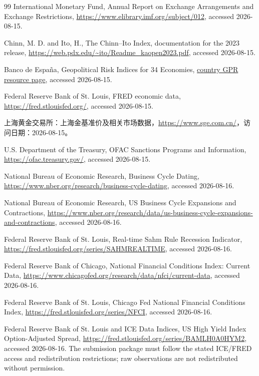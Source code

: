 \documentclass[UTF8,fontset=windows,12pt,openany]{ctexbook}
\begin{document}
\begin{thebibliography}{99}
International Monetary Fund, Annual Report on Exchange Arrangements and Exchange Restrictions, \url{https://www.elibrary.imf.org/subject/012}, accessed 2026-08-15.

Chinn, M. D. and Ito, H., The Chinn--Ito Index, documentation for the 2023 release, \url{https://web.pdx.edu/~ito/Readme_kaopen2023.pdf}, accessed 2026-08-15.

Banco de España, Geopolitical Risk Indices for 34 Economies, \href{https://www.bde.es/wbe/en/areas-actuacion/analisis-e-investigacion/recursos/indices-de-riesgo-geopolitico-generales-y-bilaterales-para-34-economias-6075d2451c9da91.html}{country GPR resource page}, accessed 2026-08-15.

Federal Reserve Bank of St. Louis, FRED economic data, \url{https://fred.stlouisfed.org/}, accessed 2026-08-15.

上海黄金交易所：上海金基准价及相关市场数据，\url{https://www.sge.com.cn/}，访问日期：2026-08-15。

U.S. Department of the Treasury, OFAC Sanctions Programs and Information, \url{https://ofac.treasury.gov/}, accessed 2026-08-15.

National Bureau of Economic Research, Business Cycle Dating, \url{https://www.nber.org/research/business-cycle-dating}, accessed 2026-08-16.

National Bureau of Economic Research, US Business Cycle Expansions and Contractions, \url{https://www.nber.org/research/data/us-business-cycle-expansions-and-contractions}, accessed 2026-08-16.

Federal Reserve Bank of St. Louis, Real-time Sahm Rule Recession Indicator, \url{https://fred.stlouisfed.org/series/SAHMREALTIME}, accessed 2026-08-16.

Federal Reserve Bank of Chicago, National Financial Conditions Index: Current Data, \url{https://www.chicagofed.org/research/data/nfci/current-data}, accessed 2026-08-16.

Federal Reserve Bank of St. Louis, Chicago Fed National Financial Conditions Index, \url{https://fred.stlouisfed.org/series/NFCI}, accessed 2026-08-16.

Federal Reserve Bank of St. Louis and ICE Data Indices, US High Yield Index Option-Adjusted Spread, \url{https://fred.stlouisfed.org/series/BAMLH0A0HYM2}, accessed 2026-08-16. The submission package must follow the stated ICE/FRED access and redistribution restrictions; raw observations are not redistributed without permission.


\end{thebibliography}
\end{document}
